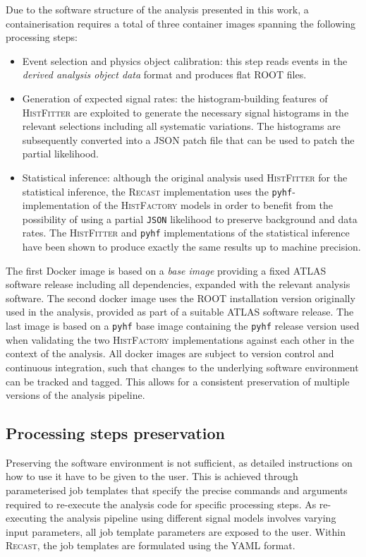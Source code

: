 Due to the software structure of the analysis presented in this work, a containerisation requires a total of three container images spanning the following processing steps:
\begin{itemize}
	\item Event selection and physics object calibration: this step reads events in the \textit{derived analysis object data} format and produces flat \textsc{ROOT} files.
	\item Generation of expected signal rates: the histogram-building features of \textsc{HistFitter} are exploited to generate the necessary signal histograms in the relevant selections including all systematic variations. The histograms are subsequently converted into a \textsc{JSON} patch file that can be used to patch the partial likelihood.
	\item Statistical inference: although the original analysis used \textsc{HistFitter} for the statistical inference, the \textsc{Recast} implementation uses the \texttt{pyhf}-implementation of the \textsc{HistFactory} models in order to benefit from the possibility of using a partial \texttt{JSON} likelihood to preserve background and data rates. The \textsc{HistFitter} and \texttt{pyhf} implementations of the statistical inference have been shown to produce exactly the same results up to machine precision.
\end{itemize}

The first Docker image is based on a \textit{base image} providing a fixed ATLAS software release including all dependencies, expanded with the relevant analysis software. The second docker image uses the \textsc{ROOT} installation version originally used in the analysis, provided as part of a suitable ATLAS software release. The last image is based on a \texttt{pyhf} base image containing the \texttt{pyhf} release version used when validating the two \textsc{HistFactory} implementations against each other in the context of the analysis. All docker images are subject to version control and continuous integration, such that changes to the underlying software environment can be tracked and tagged. This allows for a consistent preservation of multiple versions of the analysis pipeline. 

\subsection{Processing steps preservation}

Preserving the software environment is not sufficient, as detailed instructions on how to use it have to be given to the user. This is achieved through parameterised job templates that specify the precise commands and arguments required to re-execute the analysis code for specific processing steps. As re-executing the analysis pipeline using different signal models involves varying input parameters, all job template parameters are exposed to the user. Within \textsc{Recast}, the job templates are formulated using the YAML format. 

